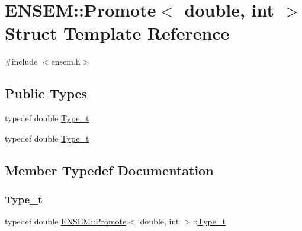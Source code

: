 \hypertarget{structENSEM_1_1Promote_3_01double_00_01int_01_4}{}\section{E\+N\+S\+EM\+:\+:Promote$<$ double, int $>$ Struct Template Reference}
\label{structENSEM_1_1Promote_3_01double_00_01int_01_4}


{\ttfamily \#include $<$ensem.\+h$>$}

\subsection*{Public Types}
\begin{DoxyCompactItemize}
\item 
typedef double \mbox{\hyperlink{structENSEM_1_1Promote_3_01double_00_01int_01_4_ae167376f3956c785560542ee33194136}{Type\+\_\+t}}
\item 
typedef double \mbox{\hyperlink{structENSEM_1_1Promote_3_01double_00_01int_01_4_ae167376f3956c785560542ee33194136}{Type\+\_\+t}}
\end{DoxyCompactItemize}


\subsection{Member Typedef Documentation}
\mbox{\label{structENSEM_1_1Promote_3_01double_00_01int_01_4_ae167376f3956c785560542ee33194136}} 
\subsubsection{\texorpdfstring{Type\_t}{Type\_t}\hspace{0.1cm}{\footnotesize\ttfamily [1/2]}}
{\footnotesize\ttfamily typedef double \mbox{\hyperlink{structENSEM_1_1Promote}{E\+N\+S\+E\+M\+::\+Promote}}$<$ double, int $>$\+::\mbox{\hyperlink{structENSEM_1_1Promote_3_01double_00_01int_01_4_ae167376f3956c785560542ee33194136}{Type\+\_\+t}}}

\mbox{\label{structENSEM_1_1Promote_3_01double_00_01int_01_4_ae167376f3956c785560542ee33194136}} 
